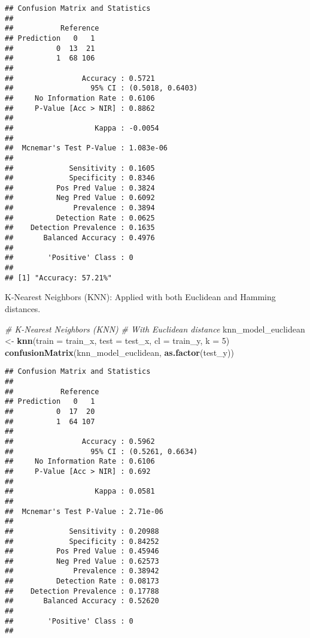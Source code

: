 \documentclass[
]{article}
\newenvironment{Shaded}{\begin{snugshade}}{\end{snugshade}}
\newcommand{\AttributeTok}[1]{\textcolor[rgb]{0.13,0.29,0.53}{#1}}
\newcommand{\CommentTok}[1]{\textcolor[rgb]{0.56,0.35,0.01}{\textit{#1}}}
\newcommand{\DecValTok}[1]{\textcolor[rgb]{0.00,0.00,0.81}{#1}}
\newcommand{\FunctionTok}[1]{\textcolor[rgb]{0.13,0.29,0.53}{\textbf{#1}}}
\newcommand{\NormalTok}[1]{#1}
\newcommand{\OtherTok}[1]{\textcolor[rgb]{0.56,0.35,0.01}{#1}}
\begin{document}
\begin{verbatim}
## Confusion Matrix and Statistics
## 
##           Reference
## Prediction   0   1
##          0  13  21
##          1  68 106
##                                           
##                Accuracy : 0.5721          
##                  95% CI : (0.5018, 0.6403)
##     No Information Rate : 0.6106          
##     P-Value [Acc > NIR] : 0.8862          
##                                           
##                   Kappa : -0.0054         
##                                           
##  Mcnemar's Test P-Value : 1.083e-06       
##                                           
##             Sensitivity : 0.1605          
##             Specificity : 0.8346          
##          Pos Pred Value : 0.3824          
##          Neg Pred Value : 0.6092          
##              Prevalence : 0.3894          
##          Detection Rate : 0.0625          
##    Detection Prevalence : 0.1635          
##       Balanced Accuracy : 0.4976          
##                                           
##        'Positive' Class : 0               
##                                           
## [1] "Accuracy: 57.21%"
\end{verbatim}

K-Nearest Neighbors (KNN): Applied with both Euclidean and Hamming
distances.

\begin{Shaded}
\begin{Highlighting}[]
\CommentTok{\# K{-}Nearest Neighbors (KNN)}
\CommentTok{\# With Euclidean distance}
\NormalTok{knn\_model\_euclidean }\OtherTok{\textless{}{-}} \FunctionTok{knn}\NormalTok{(}\AttributeTok{train =}\NormalTok{ train\_x, }\AttributeTok{test =}\NormalTok{ test\_x, }\AttributeTok{cl =}\NormalTok{ train\_y, }\AttributeTok{k =} \DecValTok{5}\NormalTok{)}
\FunctionTok{confusionMatrix}\NormalTok{(knn\_model\_euclidean, }\FunctionTok{as.factor}\NormalTok{(test\_y))}
\end{Highlighting}
\end{Shaded}

\begin{verbatim}
## Confusion Matrix and Statistics
## 
##           Reference
## Prediction   0   1
##          0  17  20
##          1  64 107
##                                           
##                Accuracy : 0.5962          
##                  95% CI : (0.5261, 0.6634)
##     No Information Rate : 0.6106          
##     P-Value [Acc > NIR] : 0.692           
##                                           
##                   Kappa : 0.0581          
##                                           
##  Mcnemar's Test P-Value : 2.71e-06        
##                                           
##             Sensitivity : 0.20988         
##             Specificity : 0.84252         
##          Pos Pred Value : 0.45946         
##          Neg Pred Value : 0.62573         
##              Prevalence : 0.38942         
##          Detection Rate : 0.08173         
##    Detection Prevalence : 0.17788         
##       Balanced Accuracy : 0.52620         
##                                           
##        'Positive' Class : 0               
## 
\end{verbatim}
\end{document}
